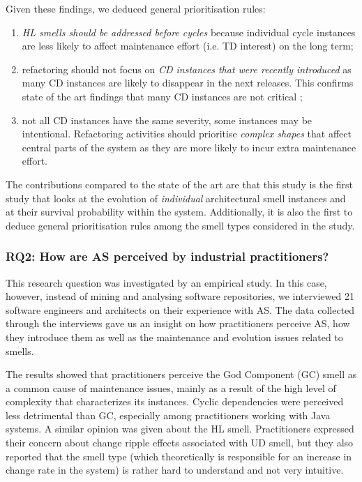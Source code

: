 Given these findings, we deduced general prioritisation rules:
\begin{enumerate}
\item \emph{HL smells should be addressed before cycles} because individual cycle instances are less likely to affect maintenance effort (i.e. TD interest) on the long term;
\item refactoring should not focus on \emph{CD instances that were recently introduced} as many CD instances are likely to disappear in the next releases. This confirms state of the art findings that many CD instances are not critical \cite{AlMutawa2014};
\item not all CD instances have the same severity, some instances may be intentional. Refactoring activities should prioritise \emph{complex shapes} that affect central parts of the system as they are more likely to incur extra maintenance effort.
\end{enumerate}

The contributions compared to the state of the art are that this study is the first study that looks at the evolution of \emph{individual} architectural smell instances and at their survival probability within the system.
Additionally, it is also the first to deduce general prioritisation rules among the smell types considered in the study.

\subsubsection*{RQ2: How are AS perceived by industrial practitioners?}
This research question was investigated by an empirical study.
In this case, however, instead of mining and analysing software repositories, we interviewed 21 software engineers and architects on their experience with AS.
The data collected through the interviews gave us an insight on how practitioners perceive AS, how they introduce them as well as the maintenance and evolution issues related to smells. 

The results showed that practitioners perceive the God Component (GC) smell as a common cause of maintenance issues, mainly as a result of the high level of complexity that characterizes its instances. 
Cyclic dependencies were perceived less detrimental than GC, especially among practitioners working with Java systems. A similar opinion was given about the HL smell.
Practitioners expressed their concern about change ripple effects associated with UD smell, but they also reported that the smell type (which theoretically is responsible for an increase in change rate in the system) is rather hard to understand and not very intuitive. 

